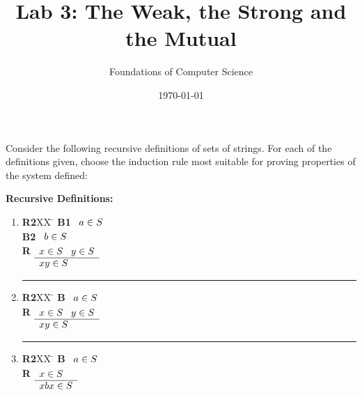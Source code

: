 \documentclass[]{exam}
\title{Lab 3: The Weak, the Strong and the Mutual}
\author{Foundations of Computer Science}
\date{\today}
\theoremstyle{definition}
\begin{document}
\maketitle

\setlength{\columnseprule}{1pt}
\begin{questions}


\question Consider the following recursive definitions of sets of strings. 
For each of the definitions given, choose the induction rule most suitable 
for proving properties of the system defined:
\begin{multicols}{2}
{\bf Recursive Definitions:}\\
\begin{enumerate}
\item
\begin{tabbing}
{\bf R2}XX \=  \kill
{\bf B1} \>
        \(\begin{array}[t]{l}
        a \in S
        \end{array}\) \\[2ex]
{\bf B2} \>
        \(\begin{array}[t]{l}
        b \in S
        \end{array}\) \\[2ex]
{\bf R} \>
        \(\begin{array}[t]{l}
        x \in S \;\;\;y \in S \\
        \hline
        xy \in S
        \end{array}\)
\end{tabbing}
\hrule
\item
\begin{tabbing}
{\bf R2}XX \=  \kill
{\bf B} \>
        \(\begin{array}[t]{l}
        a \in S
        \end{array}\) \\[2ex]
{\bf R} \>
        \(\begin{array}[t]{l}
        x \in S \;\;\;y \in S \\
        \hline
        xy \in S
        \end{array}\)
\end{tabbing}
\hrule

\item
\begin{tabbing}
{\bf R2}XX \=  \kill
{\bf B} \>
        \(\begin{array}[t]{l}
        a \in S
        \end{array}\) \\[2ex]
{\bf R} \>
        \(\begin{array}[t]{l}
        x \in S \\
        \hline
        xbx \in S
        \end{array}\)
\end{tabbing}
\end{enumerate}


\end{multicols}
\end{questions}
\end{document}
